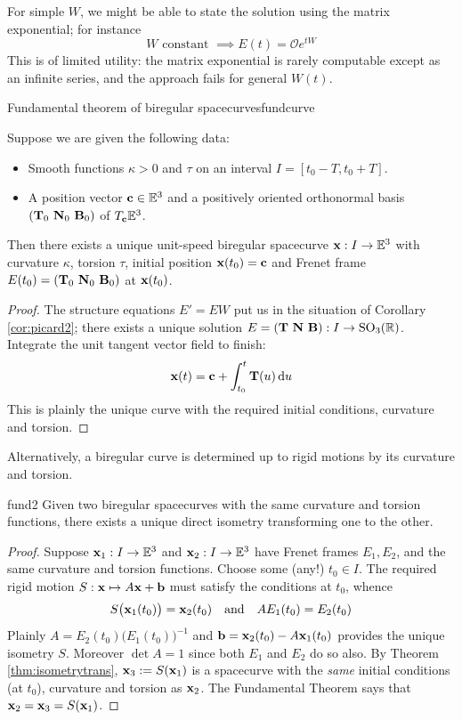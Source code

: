 For simple $W$, we might be able to state the solution using the matrix exponential; for instance
\[W\text{ constant }\implies E(t)=\mathcal Oe^{tW}\] 
This is of limited utility: the matrix exponential is rarely computable except as an infinite series, and the approach fails for general $W(t)$.


\begin{cor}{Fundamental theorem of biregular spacecurves}{fundcurve}\phantom{bob}\par
Suppose we are given the following data:
\begin{itemize}
  \item Smooth functions $\kappa>0$ and $\tau$ on an interval $I=[t_0-T,t_0+T]$.
  \item A position vector ${\mathbf{c}}\in\mathbb{E}^3$ and a positively oriented orthonormal basis $({\mathbf{T}}_0\ {\mathbf{N}}_0\ {\mathbf{B}}_0)$ of $T_{{\mathbf{c}}}\mathbb{E}^3$.
\end{itemize}
Then there exists a unique unit-speed biregular spacecurve ${\mathbf{x}}:I\to\mathbb{E}^3$ with curvature $\kappa$, torsion $\tau$, initial position ${\mathbf{x}}(t_0)={\mathbf{c}}$ and Frenet frame $E(t_0)=(\vT_0\ \vN_0\ \vB_0)$ at ${\mathbf{x}}(t_0)$.
\end{cor}

\goodbreak

\begin{proof}
The structure equations $E'=EW$ put us in the situation of Corollary \ref{cor:picard2}; there exists a unique solution $E=(\vT\ \vN\ \vB):I\to\rSO_3(\R)$. Integrate the unit tangent vector field to finish:
\[{\mathbf{x}}(t)={\mathbf{c}}+\int_{t_0}^t{\mathbf{T}}(u)\,{\mathrm{d} u}\]
This is plainly the unique curve with the required initial conditions, curvature and torsion.
\end{proof}


Alternatively, a biregular curve is determined up to rigid motions by its curvature and torsion.

\begin{cor}{}{fund2}
Given two biregular spacecurves with the same curvature and torsion functions, there exists a unique direct isometry transforming one to the other.
\end{cor}

\begin{proof}
Suppose ${\mathbf{x}}_1:I\to\mathbb{E}^3$ and ${\mathbf{x}}_2:I\to\mathbb{E}^3$ have Frenet frames $E_1,E_2$, and the same curvature and torsion functions. Choose some (any!) $t_0\in I$. The required rigid motion $S:{\mathbf{x}}\mapsto A{\mathbf{x}}+{\mathbf{b}}$ must satisfy the conditions at $t_0$, whence\footnotemark
\[S\bigl({\mathbf{x}}_1(t_0)\bigr)={\mathbf{x}}_2(t_0)\quad\text{and}\quad AE_1(t_0)=E_2(t_0)\]
Plainly $A=E_2(t_0)\bigl(E_1(t_0)\bigr)^{-1}$ and ${\mathbf{b}}={\mathbf{x}}_2(t_0)-A{\mathbf{x}}_1(t_0)$ provides the unique isometry $S$. Moreover $\det A=1$ since both $E_1$ and $E_2$ do so also.\smallbreak
By Theorem \ref{thm:isometrytrans}, ${\mathbf{x}}_3:=S({\mathbf{x}}_1)$ is a spacecurve with the \emph{same} initial conditions (at $t_0$), curvature and torsion as ${\mathbf{x}}_2$. The Fundamental Theorem says that ${\mathbf{x}}_2={\mathbf{x}}_3=S({\mathbf{x}}_1)$.
\end{proof}

